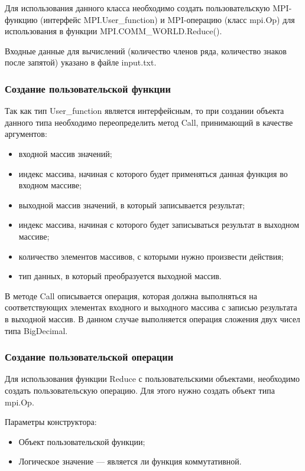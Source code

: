 \documentclass[titlepage,oneside,final,14pt]{extarticle} %
\begin{document}
Для использования данного класса необходимо создать пользовательскую MPI-функцию (интерфейс MPI.User\_function) и MPI-операцию (класс mpi.Op) для использования в функции MPI.COMM\_WORLD.Reduce().

Входные данные для вычислений (количество членов ряда, количество знаков после запятой) указано в файле input.txt.

\subsubsection{Создание пользовательской функции}

Так как тип User\_function является интерфейсным, то при создании объекта данного типа необходимо переопределить метод Call, принимающий в качестве аргументов:
\begin{itemize}
	\item входной массив значений;
	\item индекс массива, начиная с которого будет применяться данная функция во входном массиве;
	\item выходной массив значений, в который записывается результат;
	\item индекс массива, начиная с которого будет записываться результат  в выходном массиве;
	\item количество элементов массивов, с которыми нужно произвести действия;
	\item тип данных, в который преобразуется выходной массив.
\end{itemize}   

В методе Call описывается операция, которая должна выполняться на соответствующих элементах входного и выходного массива с записью результата в выходной массив. В данном случае выполняется операция сложения двух чисел типа BigDecimal.

\subsubsection{Создание пользовательской операции}

Для использования функции Reduce с пользовательскими объектами, необходимо создать пользовательскую операцию. Для этого нужно создать объект типа mpi.Op. 

Параметры конструктора:
\begin{itemize}
	\item Объект пользовательской функции;
	\item Логическое значение --- является ли функция коммутативной.
\end{itemize}
\end{document}
